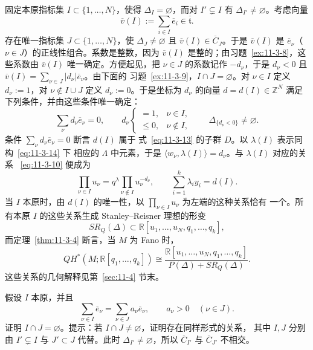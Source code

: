 固定本原指标集 $I\subset\{1,\ldots,N\}$，使得 $\Delta_I=\varnothing$，而对
$I'\subsetneq I$ 有 $\Delta_{I'}\ne\varnothing$。考虑向量
\[
  \overline v(I):=\sum_{i\in I}\overline e_i
  \in\overline{\mathfrak t}.
\]
存在唯一指标集 $J\subset\{1,\ldots,N\}$，使 $\Delta_J\ne\varnothing$ 且
$\overline v(I)\in\overline C_J$。于是 $\overline v(I)$ 是
$\overline e_\nu$（$\nu\in J$）的正线性组合。系数是整数，因为
$\overline v(I)$ 是整的；由习题~\ref{ex:11-3-8}，这些系数由
$\overline v(I)$ 唯一确定。方便起见，把 $\nu\in J$ 的系数记作 $-d_\nu$，于是
$d_\nu<0$ 且
$\overline v(I)=\sum_{\nu\in J}|d_\nu|\overline e_\nu$。由下面的
习题~\ref{ex:11-3-9}，$I\cap J=\varnothing$。对 $\nu\in I$ 定义 $d_\nu:=1$，对
$\nu\notin I\cup J$ 定义 $d_\nu:=0$。于是坐标为 $d_\nu$ 的向量
$d=d(I)\in\mathbb Z^N$ 满足下列条件，并由这些条件唯一确定：
\begin{equation}\label{eq:11-3-15}
  \sum_\nu d_\nu\overline e_\nu=0,
  \qquad
  d_\nu
  \begin{cases}
    =1,&\nu\in I,\\
    \leq0,&\nu\notin I,
  \end{cases}
  \qquad
  \Delta_{\{d_\nu<0\}}\ne\varnothing.
\end{equation}
条件 $\sum_\nu d_\nu\overline e_\nu=0$ 断言 $d(I)$ 属于
式~\eqref{eq:11-3-13} 的子群 $D$。以 $\lambda(I)$ 表示同构~\eqref{eq:11-3-14} 下
相应的 $\Lambda$ 中元素，于是
$\langle w_\nu,\lambda(I)\rangle=d_\nu$。与 $\lambda(I)$ 对应的关系
~\eqref{eq:11-3-10} 便成为
\begin{equation}\label{eq:11-3-16}
  \prod_{\nu\in I}u_\nu
  =q^\lambda\prod_{\nu\notin I}u_\nu^{-d_\nu},
  \qquad
  \sum_{i=1}^k\lambda_i y_i=d(I).
\end{equation}
当 $I$ 本原时，由 $d(I)$ 的唯一性，以 $\prod_{\nu\in I}u_\nu$ 为左端的这种关系恰有
一个。所有本原 $I$ 的这些关系生成 Stanley--Reisner 理想的形变
\[
  SR_Q(\Delta)\subset
  \mathbb R[u_1,\ldots,u_N,q_1,\ldots,q_k],
\]
而定理~\ref{thm:11-3-4} 断言，当 $M$ 为 Fano 时，
\begin{equation}\label{eq:11-3-17}
  QH^*(M;\mathbb R[q_1,\ldots,q_k])
  \cong
  \frac{\mathbb R[u_1,\ldots,u_N,q_1,\ldots,q_k]}
  {P(\Delta)+SR_Q(\Delta)}.
\end{equation}
这些关系的几何解释见第~\ref{sec:11-4} 节末。

\begin{exercise}\label{ex:11-3-9}
假设 $I$ 本原，并且
\[
  \sum_{\nu\in I}\overline e_\nu
  =\sum_{\nu\in J}a_\nu\overline e_\nu,
  \qquad a_\nu>0\quad(\nu\in J).
\]
证明 $I\cap J=\varnothing$。提示：若 $I\cap J\ne\varnothing$，证明存在同样形式的关系，
其中 $I,J$ 分别由 $I'\subsetneq I$ 与 $J'\subset J$ 代替。此时
$\Delta_{I'}\ne\varnothing$，所以 $\overline C_{I'}$ 与 $\overline C_{J'}$ 不相交。
\end{exercise}

